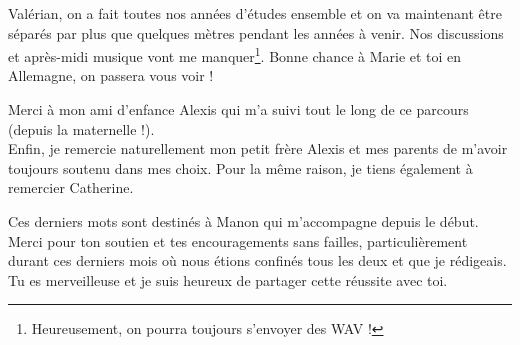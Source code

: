 Valérian, on a fait toutes nos années d'études ensemble et on va maintenant 
être séparés par plus que quelques mètres pendant les années à venir. Nos 
discussions et après-midi musique vont me manquer\footnote{Heureusement, on 
pourra toujours s'envoyer des WAV !}. Bonne chance à Marie et toi en 
Allemagne, on passera vous voir !

Merci à mon ami d'enfance Alexis qui m'a suivi tout le long de ce parcours 
(depuis la maternelle !).\\

Enfin, je remercie naturellement mon petit frère Alexis et mes parents de 
m'avoir toujours soutenu dans mes choix. Pour la même raison, je tiens 
également à remercier Catherine. 

Ces derniers mots sont destinés à Manon qui m'accompagne depuis le début. 
Merci pour ton soutien et tes encouragements sans failles, particulièrement 
durant ces derniers mois où nous étions confinés tous les deux et que je 
rédigeais. Tu es merveilleuse et je suis heureux de partager cette réussite 
avec toi.
